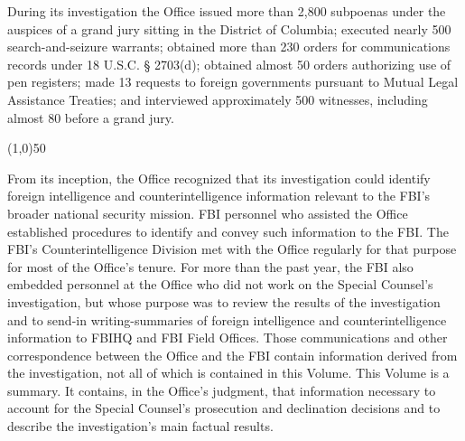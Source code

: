 \documentclass{article}
\newcommand{\hr}{\begin{center} \line(1,0){50} \end{center}}
\begin{document}
During its investigation the Office issued more than 2,800 subpoenas under the auspices of a grand jury sitting in the District of Columbia; executed nearly 500 search-and-seizure warrants; obtained more than 230 orders for communications records under 18 U.S.C. § 2703(d); obtained almost 50 orders authorizing use of pen registers; made 13 requests to foreign governments pursuant to Mutual Legal Assistance Treaties; and interviewed approximately 500 witnesses, including almost 80 before a grand jury.

\hr

From its inception, the Office recognized that its investigation could identify foreign intelligence and counterintelligence information relevant to the FBI's broader national security mission.
FBI personnel who assisted the Office established procedures to identify and convey such information to the FBI.
The FBI's Counterintelligence Division met with the Office regularly for that purpose for most of the Office's tenure.
For more than the past year, the FBI also embedded personnel at the Office who did not work on the Special Counsel's investigation, but whose purpose was to review the results of the investigation and to send-in writing-summaries of foreign intelligence and counterintelligence information to FBIHQ and FBI Field Offices.
Those communications and other correspondence between the Office and the FBI contain information derived from the investigation, not all of which is contained in this Volume.
This Volume is a summary.
It contains, in the Office's judgment, that information necessary to account for the Special Counsel's prosecution and declination decisions and to describe the investigation's main factual results.
\end{document}
